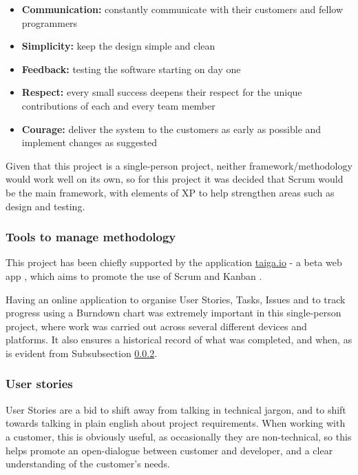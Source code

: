 \begin{itemize}
  \item \textbf{Communication: } constantly communicate with their customers and fellow programmers
  \item \textbf{Simplicity:} keep the design simple and clean
  \item \textbf{Feedback:} testing the software starting on day one
  \item \textbf{Respect: } every small success deepens their respect for the unique contributions of each and every team member
  \item \textbf{Courage: } deliver the system to the customers as early as possible and implement changes as suggested
\end{itemize}

Given that this project is a single-person project, neither framework/methodology would work well on its own, so for this project it was decided that Scrum would be the main framework, with elements of XP to help strengthen areas such as design and testing.

\subsubsection{Tools to manage methodology}

This project has been chiefly supported by the application \url{taiga.io} - a beta web app \cite{Taiga.io}, which aims to promote the use of Scrum and Kanban \cite{kanban}.

Having an online application to organise User Stories, Tasks, Issues and to track progress using a Burndown chart was extremely important in this single-person project, where work was carried out across several different devices and platforms. It also ensures a historical record of what was completed, and when, as is evident from Subsubsection \ref{sssec:user-stories}.

\subsubsection{User stories}
\label{sssec:user-stories}

User Stories are a bid to shift away from talking in technical jargon, and to shift towards talking in plain english about project requirements. When working with a customer, this is obviously useful, as occasionally they are non-technical, so this helps promote an open-dialogue between customer and developer, and a clear understanding of the customer's needs.


